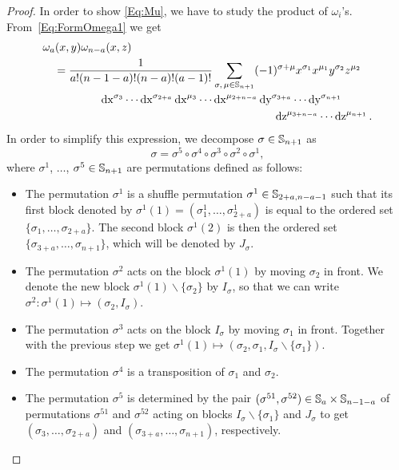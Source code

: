 \documentclass[\MainFolder/Text.tex]{subfiles}
\begin{document}
\begin{proof}
In order to show \eqref{Eq:Mu}, we have to study the product of $\omega_i$'s. From~\eqref{Eq:FormOmega1} we get
\begin{equation}\label{Eq:GenProd}
\begin{aligned}
&\omega_a(x,y)\omega_{n-a}(x,z)\\
&\quad =\begin{multlined}[t] \frac{1}{a! (n-1-a)! (n-a)! (a-1)!} \sum_{\substack{\sigma,\,\mu\in \Perm_{n+1}}} (-1)^{\sigma + \mu} x^{\sigma_1} x^{\mu_1} y^{\sigma_2} z^{\mu_2}  \\ \Diff{x}^{\sigma_3} \dotsm \Diff{x}^{\sigma_{2+a}} \Diff{x}^{\mu_3}\dotsm\Diff{x}^{\mu_{2+n-a}} 
\Diff{y}^{\sigma_{3+a}}\dotsm \Diff{y}^{\sigma_{n+1}}\\\Diff{z}^{\mu_{3+n-a}}\dotsm \Diff{z}^{\mu_{n+1}}.
\end{multlined}
\end{aligned}
\end{equation}
In order to simplify this expression, we decompose $\sigma\in \mathbb{S}_{n+1}$ as
\begin{equation} \label{Eq:Decomp}
 \sigma = \sigma^5 \circ \sigma^4 \circ \sigma^3 \circ \sigma^2 \circ \sigma^1,
 \end{equation}
where $\sigma^1$, $\dotsc$, $\sigma^5\in \mathbb{S}_{n+1}$ are permutations defined as follows:
\begin{itemize}
 \item The permutation $\sigma^1$ is a shuffle permutation $\sigma^1 \in \mathbb{S}_{2+a,n-a-1}$ such that its first block denoted by $\sigma^1(1) = (\sigma^1_1,\dotsc,\sigma^1_{2+a})$ is equal to the ordered set $\{\sigma_1, \dotsc, \sigma_{2+a}\}$. The second block $\sigma^1(2)$ is then the ordered set $\{\sigma_{3+a},\dotsc,\sigma_{n+1}\}$, which will be denoted by $J_\sigma$.
 \item The permutation $\sigma^2$ acts on the block $\sigma^1(1)$ by moving $\sigma_2$ in front. We denote the new block $\sigma^1(1)\backslash\{\sigma_2\}$ by $I_\sigma$, so that we can write $\sigma^2 : \sigma^1(1) \mapsto (\sigma_2, I_\sigma)$. 
 \item The permutation $\sigma^3$ acts on the block $I_\sigma$ by moving $\sigma_1$ in front. Together with the previous step we get $\sigma^1(1)\mapsto (\sigma_2, \sigma_1,I_\sigma\backslash\{\sigma_1\})$.
 \item The permutation $\sigma^4$ is a transposition of $\sigma_1$ and $\sigma_2$.
 \item The permutation $\sigma^5$ is determined by the pair $(\sigma^{51},\sigma^{52}) \in \mathbb{S}_{a} \times \mathbb{S}_{n-1-a}$ of permutations $\sigma^{51}$ and $\sigma^{52}$ acting on blocks $I_\sigma\backslash\{\sigma_1\}$ and $J_\sigma$ to get $(\sigma_3,\dotsc,\sigma_{2+a})$ and $(\sigma_{3+a},\dotsc,\sigma_{n+1})$, respectively.
\end{itemize}




\end{proof}
\end{document}
